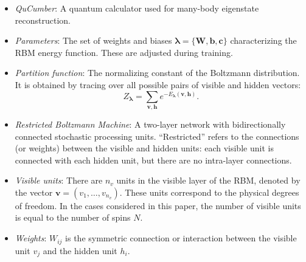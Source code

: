 \documentclass[submission, Phys, hidelnks]{SciPost}
\begin{document}
\begin{itemize}
\item \textit{QuCumber}: A quantum calculator used for many-body eigenstate reconstruction.

\item \textit{Parameters}: The set of weights and biases $\bm{\lambda} = \{\bm{W},\bm{b},\bm{c}\}$ characterizing the RBM energy function. These are adjusted during training.

\item \textit{Partition function}: The normalizing constant of the Boltzmann
distribution. It is obtained by tracing over all possible pairs of visible and
hidden vectors:
\begin{equation}
   Z_{\bm{\lambda}} = \sum\limits_{\bm{v},\bm{h}}e^{-E_{\bm{\lambda}}(\bm{v},\bm{h})}.
\end{equation}

\item \textit{Restricted Boltzmann Machine}: A two-layer network with
bidirectionally connected stochastic processing units. ``Restricted'' refers to
the connections (or weights) between the visible and hidden units: each visible
unit is connected with each hidden unit, but there are no intra-layer connections.

\item \textit{Visible units}: There are $n_v$ units in the visible layer of the
RBM, denoted by the vector $\bm{v}=(v_1,\dots,v_{n_v})$. These units correspond
to the physical degrees of freedom. In the cases considered in this paper, the
number of visible units is equal to the number of spins $N$.

\item \textit{Weights}: $W_{ij}$ is the symmetric connection or interaction
between the visible unit $v_j$ and the hidden unit $h_i$.

\end{itemize}


\nolinenumbers{}
\end{document}
